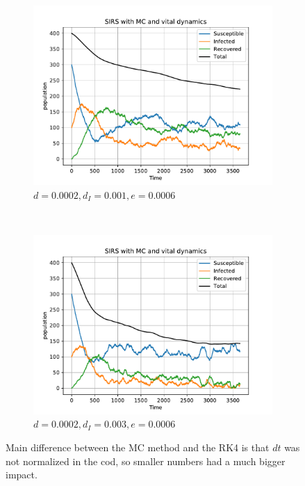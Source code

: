 \begin{figure}[H]
\begin{subfigure}{0.49\textwidth}
         \centering
         \includegraphics[width=\linewidth]{../fig/newfig/MC_vitaldynamic_d00002_dI001_e00006.pdf}
         \caption{$d = 0.0002, d_I = 0.001, e = 0.0006$}
    \end{subfigure}
     ~ 
    \begin{subfigure}{0.49\textwidth}
         \centering
         \includegraphics[width=\linewidth]{../fig/newfig/MC_vitaldynamic_d00002_dI003_e00006.pdf}
         \caption{$d = 0.0002, d_I = 0.003, e = 0.0006$}
    \end{subfigure}
    \caption{Main difference between the MC method and the RK4 is that $dt$ was not normalized in the cod, so smaller numbers had a much bigger impact.}
    \label{fig:RK4VD2}
\end{figure}


